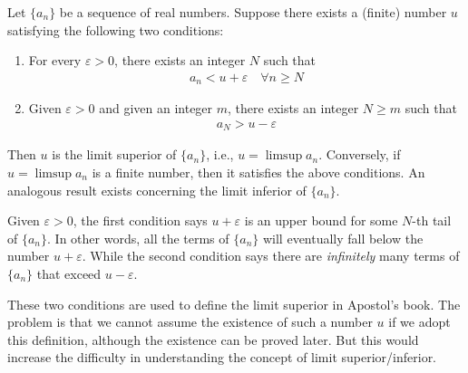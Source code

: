 \documentclass[thmcnt=section, 12pt]{my-elegantbook}
\begin{document}
\begin{theorem} \label{thm:58}
    Let $\{a_n\}$ be a sequence of real numbers. Suppose there exists a (finite) number $u$ satisfying the following two conditions:
    \begin{enumerate}
        \item For every $\varepsilon > 0$, there exists an integer $N$ such that 
        \begin{align*}
            a_n < u + \varepsilon
            \quad \forall n \geq N
        \end{align*}
        \item Given $\varepsilon > 0$ and given an integer $m$, there exists an integer $N \geq m$ such that 
        \begin{align*}
            a_N > u - \varepsilon
        \end{align*}
    \end{enumerate}
    Then $u$ is the limit superior of $\{a_n\}$, i.e., $u = \limsup a_n$. Conversely, if $u = \limsup a_n$ is a finite number, then it satisfies the above conditions. An analogous result exists concerning the limit inferior of $\{a_n\}$.
\end{theorem}

Given $\varepsilon > 0$, the first condition says $u+\varepsilon$ is an upper bound for some $N$-th tail of $\{a_n\}$. In other words, all the terms of $\{a_n\}$ will eventually fall below the number $u + \varepsilon$. While the second condition says there are \textit{infinitely} many terms of $\{a_n\}$ that exceed $u - \varepsilon$.

\begin{note}
    These two conditions are used to define the limit superior in Apostol's book\cite{apostolMathematicalAnalysisModern1974}. The problem is that we cannot assume the existence of such a number $u$ if we adopt this definition, although the existence can be proved later. But this would increase the difficulty in understanding the concept of limit superior/inferior. 
\end{note}
\end{document}
